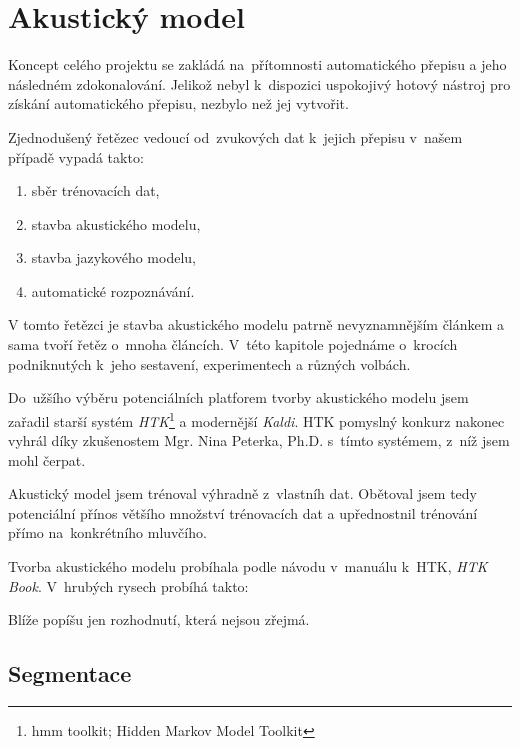 \chapter{Akustický model}
\label{kap:akusticky-model}


Koncept celého projektu se zakládá na~přítomnosti automatického přepisu a jeho
následném zdokonalování. Jelikož nebyl k~dispozici uspokojivý hotový nástroj pro
získání automatického přepisu, nezbylo než jej vytvořit.

Zjednodušený řetězec vedoucí od~zvukových dat k~jejich přepisu v~našem případě
vypadá takto:\begin{enumerate}
\item{sběr trénovacích dat,}
\item{stavba akustického modelu,}
\item{stavba jazykového modelu,}
\item{automatické rozpoznávání.}
\end{enumerate}

V tomto řetězci je stavba akustického modelu patrně nevyznamnějším článkem a
sama tvoří řetěz o~mnoha článcích. V~této kapitole pojednáme o~krocích
podniknutých k~jeho sestavení, experimentech a různých volbách.

Do~užšího výběru potenciálních platforem tvorby akustického modelu jsem zařadil
starší systém \textit{HTK}\footnote{hmm toolkit; Hidden Markov Model Toolkit} a
modernější \textit{Kaldi}. HTK pomyslný konkurz nakonec vyhrál díky zkušenostem
Mgr. Nina Peterka, Ph.D. s~tímto systémem, z~níž jsem mohl čerpat.

Akustický model jsem trénoval výhradně z~vlastníh dat. Obětoval jsem tedy
potenciální přínos většího množství trénovacích dat a upřednostnil trénování
přímo na~konkrétního mluvčího.

Tvorba akustického modelu probíhala podle návodu v~manuálu k~HTK, \textit{HTK
Book}. V~hrubých rysech probíhá takto:

Blíže popíšu jen rozhodnutí, která nejsou zřejmá.

\section{Segmentace}

